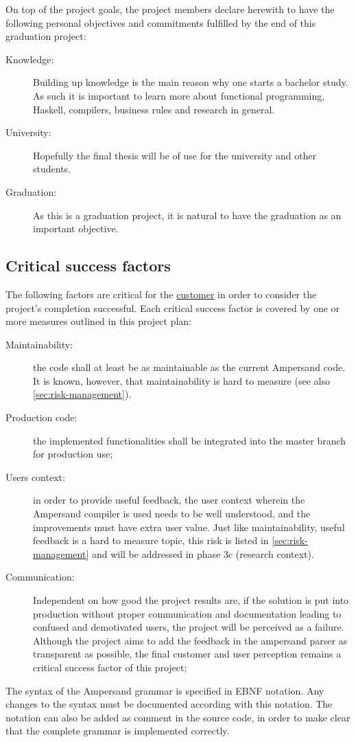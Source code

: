 On top of the project goals, the project members declare herewith to have the following personal objectives and commitments fulfilled by the end of this graduation project:
\begin{description}
	\item[Knowledge:] Building up knowledge is the main reason why one starts a bachelor study.
		As such it is important to learn more about functional programming, Haskell, compilers, business rules and research in general.
	\item[University:] Hopefully the final thesis will be of use for the university and other students.
	\item[Graduation:] As this is a graduation project, it is natural to have the graduation as an important objective.
\end{description}

\subsection{Critical success factors}
\label{subsec:success-factors}
The following factors are critical for the \underline{customer} in order to consider the project's completion successful.
Each critical success factor is covered by one or more measures outlined in this project plan:
\begin{description}
	\item[Maintainability:] the code shall at least be as maintainable as the current Ampersand code.
		It is known, however, that maintainability is hard to measure (see also \autoref{sec:risk-management}).
	\item[Production code:] the implemented functionalities shall be integrated into the master branch for production use;
	\item[Users context:] in order to provide useful feedback, the user context wherein the Ampersand compiler is used needs to be well understood, and the improvements must have extra user value. 
		Just like maintainability, useful feedback is a hard to measure topic, this risk is listed in \autoref{sec:risk-management} and will be addressed in phase 3c (research context).
	\item[Communication:] Independent on how good the project results are, if the solution is put into production without proper communication and documentation leading to confused and demotivated users, the project will be perceived as a failure. 
	Although the project aims to add the feedback in the ampersand parser as transparent as possible, the final customer and user perception remains a critical success factor of this project;
\end{description}
%
The syntax of the Ampersand grammar is specified in EBNF notation.
Any changes to the syntax must be documented according with this notation.
The notation can also be added as comment in the source code, in order to make clear that the complete grammar is implemented correctly.

